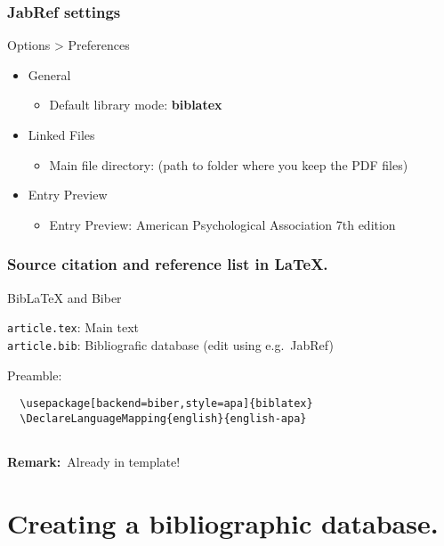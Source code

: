 \documentclass[aspectratio=169]{beamer}
\begin{document}
\begin{frame}
    \frametitle{JabRef settings}
    
   Options > Preferences

   \begin{itemize}
        \item General
        \begin{itemize}
            \item Default library mode: \textbf{biblatex}
        \end{itemize}
        \item Linked Files
        \begin{itemize}
            \item Main file directory: (path to folder where you keep the PDF files)
        \end{itemize}
        \item{Entry Preview}
        \begin{itemize}
            \item Entry Preview: American Psychological Association 7th edition
        \end{itemize}
    \end{itemize}
    
\end{frame}
\begin{frame}[fragile]
  \frametitle{Source citation and reference list in {\LaTeX}.}

  Bib{\LaTeX} and Biber

  \vspace{18pt}

  \verb|article.tex|: Main text\\
  \verb|article.bib|: Bibliografic database (edit using e.g.~JabRef)

  \bigskip

  Preamble:

  \begin{verbatim}
  \usepackage[backend=biber,style=apa]{biblatex}
  \DeclareLanguageMapping{english}{english-apa}
  
  \end{verbatim}

    \textbf{Remark:}\ Already in template!   

\end{frame}

\section{Creating a bibliographic database.}
\end{document}
